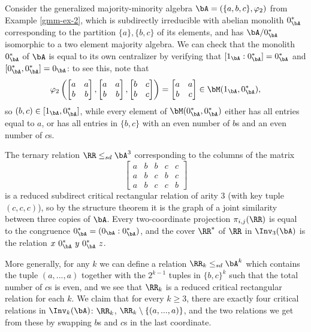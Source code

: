 \begin{ex}\label{gmm-ex-2-critical} Consider the generalized majority-minority algebra $\bA = (\{a,b,c\}, \varphi_2)$ from Example \ref{gmm-ex-2}, which is subdirectly irreducible with abelian monolith $0_{\bA}^*$ corresponding to the partition $\{a\}, \{b,c\}$ of its elements, and has $\bA/0_\bA^*$ isomorphic to a two element majority algebra. We can check that the monolith $0_{\bA}^*$ of $\bA$ is equal to its own centralizer by verifying that $[1_{\bA}:0_\bA^*] = 0_\bA^*$ and $[0_\bA^*,0_\bA^*] = 0_\bA$: to see this, note that
\[
\varphi_2\left(\begin{bmatrix} a & a\\ b & b\end{bmatrix}, \begin{bmatrix} a & a\\ b & b\end{bmatrix}, \begin{bmatrix} b & c\\ b & c\end{bmatrix}\right) = \begin{bmatrix} a & a\\ b & c\end{bmatrix} \in \bM(1_\bA,0_\bA^*),
\]
so $(b,c) \in [1_\bA,0_\bA^*]$, while every element of $\bM(0_\bA^*,0_\bA^*)$ either has all entries equal to $a$, or has all entries in $\{b,c\}$ with an even number of $b$s and an even number of $c$s.

The ternary relation $\RR \le_{sd} \bA^3$ corresponding to the columns of the matrix
\[
\begin{bmatrix} a & b & b & c & c\\ a & b & c & b & c\\ a & b & c & c & b\end{bmatrix}
\]
is a reduced subdirect critical rectangular relation of arity $3$ (with key tuple $(c,c,c)$), so by the structure theorem it is the graph of a joint similarity between three copies of $\bA$. Every two-coordinate projection $\pi_{i,j}(\RR)$ is equal to the congruence $0_{\bA}^* = (0_\bA : 0_\bA^*)$, and the cover $\RR^*$ of $\RR$ in $\Inv_3(\bA)$ is the relation $x\ 0_\bA^*\ y\ 0_\bA^*\ z$.

More generally, for any $k$ we can define a relation $\RR_k \le_{sd} \bA^k$ which contains the tuple $(a,...,a)$ together with the $2^{k-1}$ tuples in $\{b,c\}^k$ such that the total number of $c$s is even, and we see that $\RR_k$ is a reduced critical rectangular relation for each $k$. We claim that for every $k \ge 3$, there are exactly four critical relations in $\Inv_k(\bA)$: $\RR_k$, $\RR_k \setminus\{(a,...,a)\}$, and the two relations we get from these by swapping $b$s and $c$s in the last coordinate.


\end{ex}

